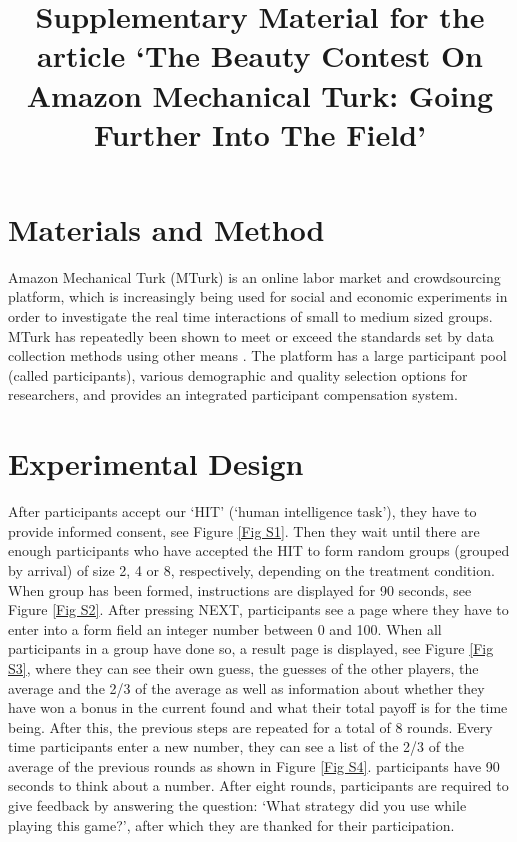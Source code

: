\title{Supplementary Material for the article `The Beauty Contest On Amazon Mechanical Turk: Going Further Into The Field'}

\section{Materials and Method}
\noindent
Amazon Mechanical Turk (MTurk) is an online labor market and crowdsourcing platform, which is increasingly being used for social and economic experiments in order to investigate the real time interactions of small to medium sized groups. MTurk has repeatedly been shown to meet or exceed the standards set by data collection methods using other means \citep{berinsky_huber_lenz_2012, BuhrmesterEtAl18}. The platform has a large participant pool (called participants), various demographic and quality selection options for researchers, and provides an integrated participant compensation system.

\section{Experimental Design}
\noindent
After participants accept our ‘HIT’ (‘human intelligence task’), they have to provide informed consent, see Figure \ref{Fig S1}. Then they wait until there are enough participants who have accepted the HIT to form random groups (grouped by arrival) of size 2, 4 or 8, respectively, depending on the treatment condition. When group has been formed, instructions are displayed for 90 seconds, see Figure \ref{Fig S2}. After pressing NEXT, participants see a page where they have to enter into a form field an integer number between 0 and 100. When all participants in a group have done so, a result page is displayed, see Figure \ref{Fig S3}, where they can see their own guess, the guesses of the other players, the average and the 2/3 of the average as well as information about whether they have won a bonus in the current found and what their total payoff is for the time being. After this, the previous steps are repeated for a total of 8 rounds. Every time participants enter a new number, they can see a list of the 2/3 of the average of the previous rounds as shown in Figure \ref{Fig S4}. participants have 90 seconds to think about a number. After eight rounds, participants are required to give feedback by answering the question: ‘What strategy did you use while playing this game?’, after which they are thanked for their participation.

